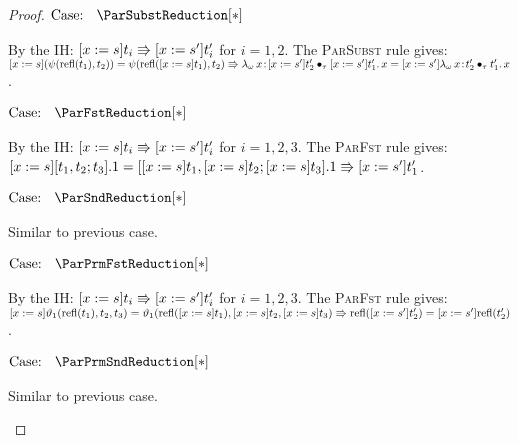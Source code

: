 \begin{proof}
    $\text{Case: }\begin{array}{c} \ParSubstReduction[*] \end{array}$
    \begin{proofcase}
        By the IH: $[x := s]t_i \Rrightarrow [x := s^\prime]t_i^\prime$ for $i = 1, 2$.
        The \textsc{ParSubst} rule gives:
        $[x := s](\psi(\text{refl}(t_1), t_2)) = \psi(\text{refl}([x := s]t_1), t_2) \Rrightarrow {\lambda_\omega}\, x\! : \! [x := s^\prime]t_2^\prime \bullet_{\tau} [x := s^\prime]t_1^\prime.\, x = [x := s^\prime]{\lambda_\omega}\, x\! : \! t_2^\prime \bullet_{\tau} t_1^\prime.\, x$.
    \end{proofcase}

    $\text{Case: }\begin{array}{c} \ParFstReduction[*] \end{array}$
    \begin{proofcase}
        By the IH: $[x := s]t_i \Rrightarrow [x := s^\prime]t_i^\prime$ for $i = 1, 2, 3$.
        The \textsc{ParFst} rule gives:
        $[x := s][t_1, t_2; t_3].1 = [[x := s]t_1, [x := s]t_2; [x := s]t_3].1 \Rrightarrow [x := s^\prime]t_1^\prime$.
    \end{proofcase}

    $\text{Case: }\begin{array}{c} \ParSndReduction[*] \end{array}$
    \begin{proofcase}
        Similar to previous case.
    \end{proofcase}

    $\text{Case: }\begin{array}{c} \ParPrmFstReduction[*] \end{array}$
    \begin{proofcase}
        By the IH: $[x := s]t_i \Rrightarrow [x := s^\prime]t_i^\prime$ for $i = 1, 2, 3$.
        The \textsc{ParFst} rule gives:
        $[x := s]\vartheta_1(\text{refl}(t_1), t_2, t_3) = \vartheta_1(\text{refl}([x := s]t_1), [x := s]t_2, [x := s]t_3) \Rrightarrow \text{refl}([x := s^\prime]t_2^\prime) = [x := s^\prime]\text{refl}(t_2^\prime)$.
    \end{proofcase}

    $\text{Case: }\begin{array}{c} \ParPrmSndReduction[*] \end{array}$
    \begin{proofcase}
        Similar to previous case.
    \end{proofcase}
\end{proof}

